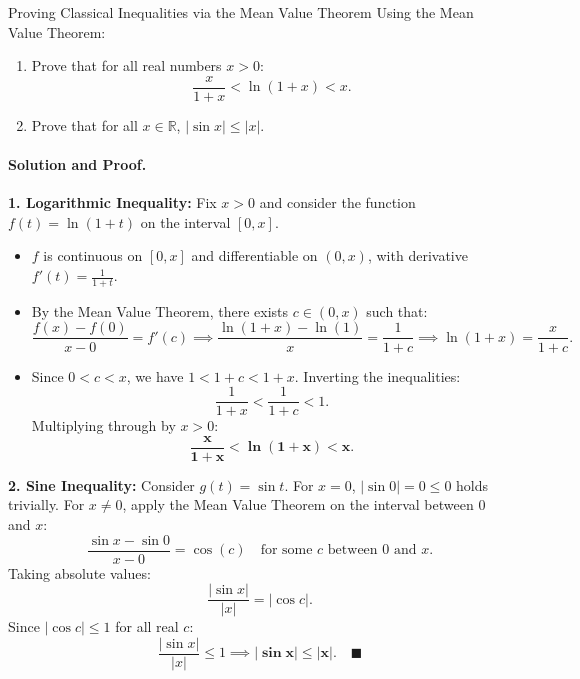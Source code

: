 \begin{workedexample}{Proving Classical Inequalities via the Mean Value Theorem}
Using the Mean Value Theorem:
\begin{enumerate}[leftmargin=1.4em,itemsep=2pt]
  \item Prove that for all real numbers $x > 0$:
  \[
  \frac{x}{1 + x} < \ln(1 + x) < x.
  \]
  \item Prove that for all $x \in \mathbb{R}$, $|\sin x| \le |x|$.
\end{enumerate}

\paragraph{Solution and Proof.}
\textbf{1. Logarithmic Inequality:}
Fix $x > 0$ and consider the function $f(t) = \ln(1 + t)$ on the interval $[0, x]$.
\begin{itemize}[leftmargin=1.4em,itemsep=2pt]
  \item $f$ is continuous on $[0, x]$ and differentiable on $(0, x)$, with derivative $f'(t) = \frac{1}{1 + t}$.
  \item By the Mean Value Theorem, there exists $c \in (0, x)$ such that:
  \[
  \frac{f(x) - f(0)}{x - 0} = f'(c) \implies \frac{\ln(1 + x) - \ln(1)}{x} = \frac{1}{1 + c} \implies \ln(1 + x) = \frac{x}{1 + c}.
  \]
  \item Since $0 < c < x$, we have $1 < 1 + c < 1 + x$.
  Inverting the inequalities:
  \[
  \frac{1}{1 + x} < \frac{1}{1 + c} < 1.
  \]
  Multiplying through by $x > 0$:
  \[
  \mathbf{\frac{x}{1 + x} < \ln(1 + x) < x}.
  \]
\end{itemize}

\textbf{2. Sine Inequality:}
Consider $g(t) = \sin t$.
For $x = 0$, $|\sin 0| = 0 \le 0$ holds trivially.
For $x \neq 0$, apply the Mean Value Theorem on the interval between $0$ and $x$:
\[
\frac{\sin x - \sin 0}{x - 0} = \cos(c) \quad \text{for some } c \text{ between } 0 \text{ and } x.
\]
Taking absolute values:
\[
\frac{|\sin x|}{|x|} = |\cos c|.
\]
Since $|\cos c| \le 1$ for all real $c$:
\[
\frac{|\sin x|}{|x|} \le 1 \implies \mathbf{|\sin x| \le |x|}. \quad \blacksquare
\]
\end{workedexample}

